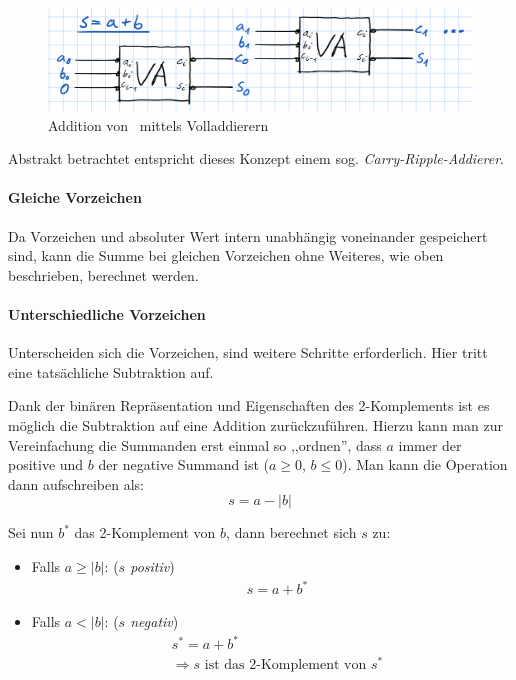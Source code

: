         \begin{figure}[H]
            \centering
            \includegraphics[width=0.7\linewidth]{images/fulladderchain}
            \caption{Addition von \mpi\ mittels Volladdierern}
            \label{fig:fulladderchain}
        \end{figure}

        Abstrakt betrachtet entspricht dieses Konzept einem sog. \emph{Carry-Ripple-Addierer}.

    \paragraph*{Gleiche Vorzeichen}
        Da Vorzeichen und absoluter Wert intern unabhängig voneinander gespeichert sind, kann die Summe bei gleichen Vorzeichen ohne Weiteres, wie oben beschrieben, berechnet werden.

    \paragraph*{Unterschiedliche Vorzeichen}
        Unterscheiden sich die Vorzeichen, sind weitere Schritte erforderlich. Hier tritt eine tatsächliche Subtraktion auf.


        Dank der binären Repräsentation und Eigenschaften des 2-Komplements ist es möglich die Subtraktion auf eine Addition zurückzuführen.
        Hierzu kann man zur Vereinfachung die Summanden erst einmal so ,,ordnen'', dass $a$ immer  der positive und $b$ der negative Summand ist ($a \ge 0$, $b \le 0$). Man kann die Operation dann aufschreiben als:
        \begin{equation*}
        s = a - |b|
        \end{equation*}

        Sei nun $b^*$ das 2-Komplement von $b$, dann berechnet sich $s$ zu:

        \begin{itemize} \tightlist
            \item Falls $a \ge |b|$: (\emph{$s$ positiv})
                \begin{align*}
                    & s = a + b^*
                \end{align*}
            \item Falls $a < |b|$: (\emph{$s$ negativ})
                \begin{align*}
                    & s^* = a + b^* \\
                    & \Rightarrow s \text{ ist das 2-Komplement von } s^*
                \end{align*}
        \end{itemize}


